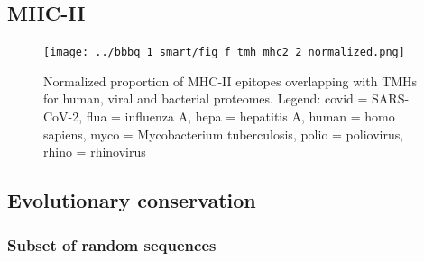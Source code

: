 


\subsection{MHC-II}

\begin{figure}[!htbp]
  \texttt{[image: ../bbbq\_1\_smart/fig\_f\_tmh\_mhc2\_2\_normalized.png]}
  \caption{
    Normalized proportion of MHC-II epitopes overlapping with TMHs
    for human, viral and bacterial proteomes.
    Legend: covid = SARS-CoV-2, flua = influenza A, hepa = hepatitis A,
    human = homo sapiens, myco = Mycobacterium tuberculosis, 
    polio = poliovirus, rhino = rhinovirus
  }
  \label{fig:f_tmh_mhc2_normalized}
\end{figure}

\begin{table}
  \centering
  
\end{table}

\subsection{Evolutionary conservation}

\subsubsection{Subset of random sequences}



